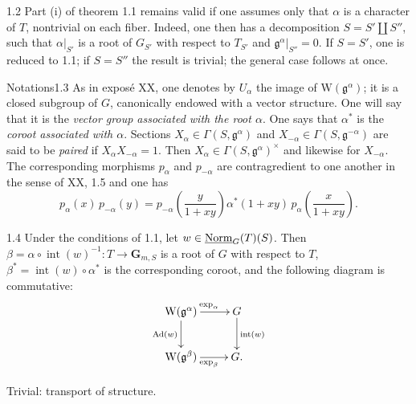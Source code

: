 \begin{remark}{1.2}\label{XXII.1.2}
Part (i) of theorem 1.1 remains valid if one assumes only that $\alpha$ is a character of $T$, nontrivial on each fiber. Indeed, one then has a decomposition $S=S'\amalg S''$, such that $\alpha|_{S'}$ is a root of $G_{S'}$ with respect to $T_{S'}$ and $\mathfrak g^\alpha|_{S''}=0$. If $S=S'$, one is reduced to 1.1; if $S=S''$ the result is trivial; the general case follows at once.
\end{remark}
\begin{enoncerm}{Notations}{1.3}\label{XXII.1.3}
As in expos\'e XX, one denotes by $U_\alpha$ the image of $\mathrm W(\mathfrak g^\alpha)$; it is a closed subgroup of $G$, canonically endowed with a vector structure. One will say that it is the \emph{vector group associated with the root $\alpha$}. One says that $\alpha^*$ is the \emph{coroot associated with $\alpha$}. Sections $X_\alpha\in\Gamma(S,\mathfrak g^\alpha)$ and $X_{-\alpha}\in\Gamma(S,\mathfrak g^{-\alpha})$ are said to be \emph{paired} if $X_\alpha X_{-\alpha}=1$. Then $X_\alpha\in\Gamma(S,\mathfrak g^\alpha)^\times$ and likewise for $X_{-\alpha}$. The corresponding morphisms $p_\alpha$ and $p_{-\alpha}$ are contragredient to one another in the sense of XX, 1.5{\renewcommand{\thefootnote}{(2)}} and one has
\[
p_\alpha(x)\,p_{-\alpha}(y)=p_{-\alpha}\left(\frac y{1+xy}\right)\alpha^*(1+xy)\,p_\alpha\left(\frac x{1+xy}\right).
\]
\end{enoncerm}
\begin{proposition}{1.4}\label{XXII.1.4}
Under the conditions of 1.1, let $w\in\underline{\mathrm{Norm}}_G(T)(S)$. Then $\beta=\alpha\circ\operatorname{int}(w)^{-1}:T\to\mathbf G_{m,S}$ is a root of $G$ with respect to $T$, $\beta^*=\operatorname{int}(w)\circ\alpha^*$ is the corresponding coroot, and the following diagram is commutative:
\[
\xymatrix{\mathrm W(\mathfrak g^\alpha)\ar[r]^{\exp_\alpha}\ar[d]_{\Ad(w)}&G\ar[d]^{\operatorname{int}(w)}\\
\mathrm W(\mathfrak g^\beta)\ar[r]_{\exp_\beta}&G.}
\]
\end{proposition}
Trivial: transport of structure.

